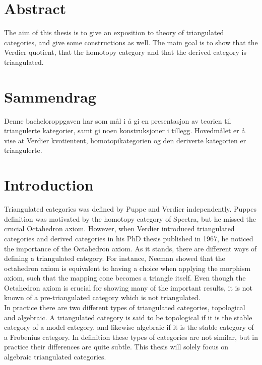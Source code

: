 \chapter*{Abstract}
    The aim of this thesis is to give an exposition to theory of triangulated categories, and give some constructions as well. The main goal is to show that the Verdier quotient, that the homotopy category and that the derived category is triangulated.

\chapter*{Sammendrag}
    Denne bacheloroppgaven har som mål i å gi en presentasjon av teorien til triangulerte kategorier, samt gi noen konstruksjoner i tillegg. Hovedmålet er å vise at Verdier kvotientent, homotopikategorien og den deriverte kategorien er triangulerte.

\chapter*{Introduction}

    Triangulated categories was defined by Puppe and Verdier independently. Puppes definition was motivated by the homotopy category of Spectra, but he missed the crucial Octahedron axiom. However, when Verdier introduced triangulated categories and derived categories in his PhD thesis published in 1967, he noticed the importance of the Octahedron axiom. As it stands, there are different ways of defining a triangulated category. For instance, Neeman showed that the octahedron axiom is equivalent to having a choice when applying the morphism axiom, such that the mapping cone becomes a triangle itself. Even though the Octahedron axiom is crucial for showing many of the important results, it is not known of a pre-triangulated category which is not triangulated. \\
    
    In practice there are two different types of triangulated categories, topological and algebraic. A triangulated category is said to be topological if it is the stable category of a model category, and likewise algebraic if it is the stable category of a Frobenius category. In definition these types of categories are not similar, but in practice their differences are quite subtle. This thesis will solely focus on algebraic triangulated categories. \\

